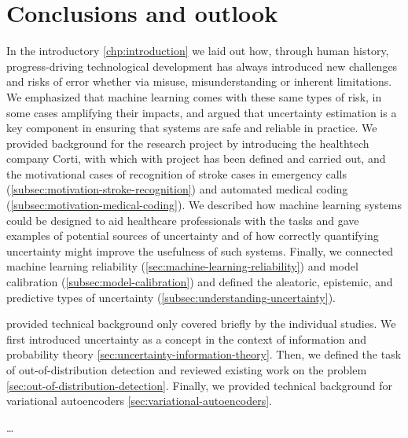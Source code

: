 
\chapter[conclusions and outlook]{Conclusions and outlook}\label{chp:conclusion}

In the introductory \cref{chp:introduction} we laid out how, through human history, progress-driving technological development has always introduced new challenges and risks of error whether via misuse, misunderstanding or inherent limitations. We emphasized that machine learning comes with these same types of risk, in some cases amplifying their impacts, and argued that uncertainty estimation is a key component in ensuring that systems are safe and reliable in practice. We provided background for the research project by introducing the healthtech company Corti, with which with project has been defined and carried out, and the motivational cases of recognition of stroke cases in emergency calls (\cref{subsec:motivation-stroke-recognition}) and automated medical coding (\cref{subsec:motivation-medical-coding}). We described how machine learning systems could be designed to aid healthcare professionals with the tasks and gave examples of potential sources of uncertainty and of how correctly quantifying uncertainty might improve the usefulness of such systems. Finally, we connected machine learning reliability (\cref{sec:machine-learning-reliability}) and model calibration (\cref{subsec:model-calibration}) and defined the aleatoric, epistemic, and predictive types of uncertainty (\cref{subsec:understanding-uncertainty}).

 provided technical background only covered briefly by the individual studies. We first introduced uncertainty as a concept in the context of information and probability theory \cref{sec:uncertainty-information-theory}. Then, we defined the task of out-of-distribution detection and reviewed existing work on the problem \cref{sec:out-of-distribution-detection}. Finally, we provided technical background for variational autoencoders \cref{sec:variational-autoencoders}.

\dots
